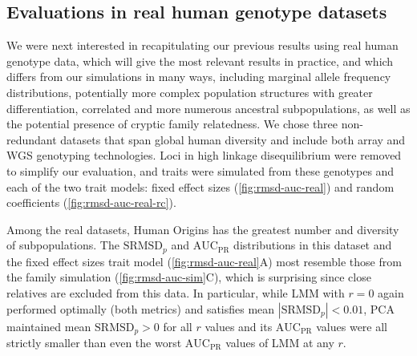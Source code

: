\documentclass[11pt]{article}
\newcommand{\rmsd}{\text{SRMSD}_p}
\newcommand{\auc}{\text{AUC}_\text{PR}}
\begin{document}
\subsection{Evaluations in real human genotype datasets}

We were next interested in recapitulating our previous results using real human genotype data, which will give the most relevant results in practice, and which differs from our simulations in many ways, including marginal allele frequency distributions, potentially more complex population structures with greater differentiation, correlated and more numerous ancestral subpopulations, as well as the potential presence of cryptic family relatedness.
We chose three non-redundant datasets that span global human diversity and include both array and WGS genotyping technologies.
Loci in high linkage disequilibrium were removed to simplify our evaluation, and traits were simulated from these genotypes and each of the two trait models: fixed effect sizes (\cref{fig:rmsd-auc-real}) and random coefficients (\cref{fig:rmsd-auc-real-rc}).

Among the real datasets, Human Origins has the greatest number and diversity of subpopulations.
The $\rmsd$ and $\auc$ distributions in this dataset and the fixed effect sizes trait model (\cref{fig:rmsd-auc-real}A) most resemble those from the family simulation (\cref{fig:rmsd-auc-sim}C), which is surprising since close relatives are excluded from this data.
In particular, while LMM with $r=0$ again performed optimally (both metrics) and satisfies mean $|\rmsd| < 0.01$, PCA maintained mean $\rmsd > 0$ for all $r$ values and its $\auc$ values were all strictly smaller than even the worst $\auc$ values of LMM at any $r$.
\end{document}
